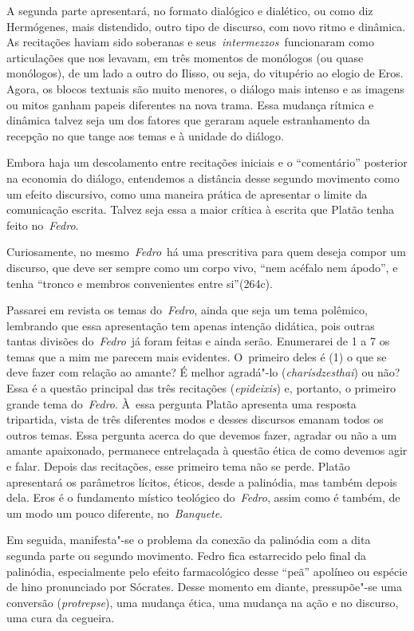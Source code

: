 A segunda parte apresentará, no formato dialógico e dialético, ou como
diz Hermógenes, mais distendido, outro tipo de discurso, com novo ritmo
e dinâmica. As recitações haviam sido soberanas e
seus~\emph{intermezzos}~funcionaram como articulações que nos levavam,
em três momentos de monólogos (ou quase monólogos), de um lado a outro
do Ilisso, ou seja, do vitupério ao elogio de Eros. Agora, os blocos
textuais são muito menores, o diálogo mais intenso e as imagens ou mitos
ganham papeis diferentes na nova trama. Essa mudança rítmica e dinâmica
talvez seja um dos fatores que geraram aquele estranhamento da recepção
no que tange aos temas e à unidade do diálogo.

Embora haja um descolamento entre recitações iniciais e o ``comentário''
posterior na economia do diálogo, entendemos a distância desse segundo
movimento como um efeito discursivo, como uma maneira prática de
apresentar o limite da comunicação escrita. Talvez seja essa a maior
crítica à escrita que Platão tenha feito no~\emph{Fedro}.

Curiosamente, no mesmo~\emph{Fedro}~há uma prescritiva para quem deseja
compor um discurso, que deve ser sempre como um corpo vivo, ``nem
acéfalo nem ápodo'', e tenha ``tronco e membros convenientes entre
si''(264c).

Passarei em revista os temas do~\emph{Fedro}, ainda que seja um tema
polêmico, lembrando que essa apresentação tem apenas intenção didática,
pois outras tantas divisões do~\emph{Fedro}~já foram feitas e ainda
serão. Enumerarei de 1 a 7 os temas que a mim me parecem mais evidentes.
O~primeiro deles é (1) o que se deve fazer com relação ao amante? É
melhor agradá"-lo (\emph{charísdzesthai}) ou não? Essa é a questão
principal das três recitações (\emph{epideixis}) e, portanto, o primeiro
grande tema do~\emph{Fedro}. À~essa pergunta Platão apresenta uma
resposta tripartida, vista de três diferentes modos e desses discursos
emanam todos os outros temas. Essa pergunta acerca do que devemos fazer,
agradar ou não a um amante apaixonado, permanece entrelaçada à questão
ética de como devemos agir e falar. Depois das recitações, esse primeiro
tema não se perde. Platão apresentará os parâmetros lícitos, éticos,
desde a palinódia, mas também depois dela. Eros é o fundamento místico
teológico do~\emph{Fedro}, assim como é também, de um modo um pouco
diferente, no~\emph{Banquete}.

Em seguida, manifesta"-se o problema da conexão da palinódia com a dita
segunda parte ou segundo movimento. Fedro fica estarrecido pelo final da
palinódia, especialmente pelo efeito farmacológico desse ``peã''
apolíneo ou espécie de hino pronunciado por Sócrates. Desse momento em
diante, pressupõe"-se uma conversão (\emph{protrepse}), uma mudança
ética, uma mudança na ação e no discurso, uma cura da cegueira.

